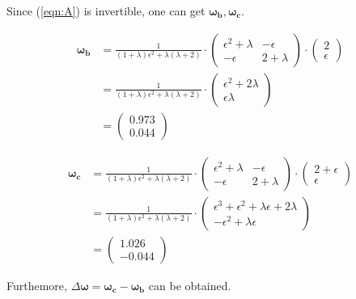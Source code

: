 \documentclass[12pt]{article}
\begin{document}
Since (\ref{eqn:A}) is invertible, one can get $\boldsymbol{\omega_b}, \boldsymbol{\omega_c}$. 

\begin{align*}
    \boldsymbol{\omega_b} &= \frac{1}{(1+\lambda)\epsilon^2 + \lambda(\lambda + 2)} \cdot \begin{pmatrix}
        \epsilon^2 + \lambda & - \epsilon \\ - \epsilon & 2 + \lambda
    \end{pmatrix} \cdot \begin{pmatrix}
        2 \\ \epsilon
    \end{pmatrix}\\
    &= \frac{1}{(1+\lambda)\epsilon^2 + \lambda(\lambda + 2)} \cdot \begin{pmatrix}
        \epsilon^2 + 2\lambda \\ \epsilon\lambda
    \end{pmatrix} \\
    &= \begin{pmatrix}
        0.973\\ 0.044
    \end{pmatrix}
\end{align*}

\begin{align*}
    \boldsymbol{\omega_c} &= \frac{1}{(1+\lambda)\epsilon^2 + \lambda(\lambda + 2)} \cdot \begin{pmatrix}
        \epsilon^2 + \lambda & - \epsilon \\ - \epsilon & 2 + \lambda
    \end{pmatrix} \cdot \begin{pmatrix}
        2 + \epsilon \\ \epsilon
    \end{pmatrix}\\
    &= \frac{1}{(1+\lambda)\epsilon^2 + \lambda(\lambda + 2)} \cdot \begin{pmatrix}
        \epsilon^3 + \epsilon^2 +\lambda \epsilon + 2 \lambda \\ -\epsilon^2 + \lambda\epsilon
    \end{pmatrix} \\
    &= \begin{pmatrix}
        1.026 \\ -0.044
    \end{pmatrix}
\end{align*}

Furthemore, $\Delta \boldsymbol{\omega} = \boldsymbol{\omega_c} - \boldsymbol{\omega_b}$ can be obtained. 
\end{document}
